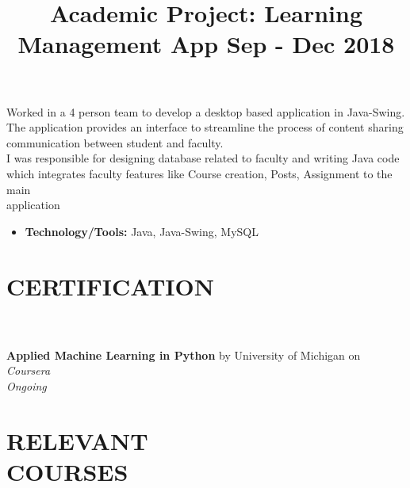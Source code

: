 \documentclass[margin]{res}
\begin{document}
\begin{resume}
\location{}
\title{\textbf{Academic Project: Learning Management App \hfill Sep - Dec 2018}
 }
\begin{position}
Worked in a 4 person team to develop a desktop based application in Java-Swing. The application provides an interface to streamline the process of content sharing communication between student and faculty.\\
I was responsible for designing database related to faculty and writing Java code which integrates faculty features like Course creation, Posts, Assignment to the main \\application
\begin{itemize}
\item \textbf{Technology/Tools:} Java, Java-Swing, MySQL 
\end{itemize}
\end{position}


\section{CERTIFICATION}
\par
{}
\\
\\
\textbullet{} \textbf{Applied Machine Learning in Python} by University of Michigan on \sl{Coursera} \\ Ongoing


\section{RELEVANT\\COURSES}
\par



\end{resume}
\end{document}
